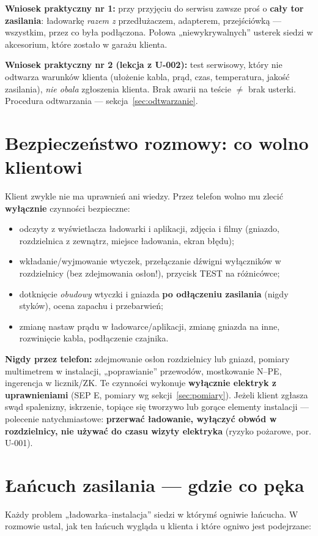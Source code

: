 \documentclass[11pt]{article}
\newcommand{\key}[1]{\textbf{\color{navy}#1}}
\newcommand{\warn}[1]{\textbf{\color{warnred}#1}}
\begin{document}
\key{Wniosek praktyczny nr 1:} przy przyjęciu do serwisu zawsze proś o \key{cały tor zasilania}: ładowarkę \emph{razem z} przedłużaczem, adapterem, przejściówką — wszystkim, przez co była podłączona. Połowa „niewykrywalnych'' usterek siedzi w akcesorium, które zostało w garażu klienta.

\key{Wniosek praktyczny nr 2 (lekcja z U-002):} test serwisowy, który nie odtwarza warunków klienta (ułożenie kabla, prąd, czas, temperatura, jakość zasilania), \emph{nie obala} zgłoszenia klienta. Brak awarii na teście $\neq$ brak usterki. Procedura odtwarzania — sekcja~\ref{sec:odtwarzanie}.

\section{Bezpieczeństwo rozmowy: co wolno klientowi}\label{sec:bezpieczenstwo}
Klient zwykle nie ma uprawnień ani wiedzy. Przez telefon wolno mu zlecić \key{wyłącznie} czynności bezpieczne:
\begin{itemize}
\item odczyty z wyświetlacza ładowarki i aplikacji, zdjęcia i filmy (gniazdo, rozdzielnica z zewnątrz, miejsce ładowania, ekran błędu);
\item wkładanie/wyjmowanie wtyczek, przełączanie dźwigni wyłączników w rozdzielnicy (bez zdejmowania osłon!), przycisk TEST na różnicówce;
\item dotknięcie \emph{obudowy} wtyczki i gniazda \key{po odłączeniu zasilania} (nigdy styków), ocena zapachu i przebarwień;
\item zmianę nastaw prądu w ładowarce/aplikacji, zmianę gniazda na inne, rozwinięcie kabla, podłączenie czajnika.
\end{itemize}
\warn{Nigdy przez telefon:} zdejmowanie osłon rozdzielnicy lub gniazd, pomiary multimetrem w instalacji, „poprawianie'' przewodów, mostkowanie N--PE, ingerencja w licznik/ZK. Te czynności wykonuje \key{wyłącznie elektryk z uprawnieniami} (SEP E, pomiary wg sekcji~\ref{sec:pomiary}). Jeżeli klient zgłasza swąd spalenizny, iskrzenie, topiące się tworzywo lub gorące elementy instalacji — polecenie natychmiastowe: \warn{przerwać ładowanie, wyłączyć obwód w rozdzielnicy, nie używać do czasu wizyty elektryka} (ryzyko pożarowe, por. U-001).

\section{Łańcuch zasilania — gdzie co pęka}\label{sec:lancuch}
Każdy problem „ładowarka--instalacja'' siedzi w którymś ogniwie łańcucha. W rozmowie ustal, jak ten łańcuch wygląda u klienta i które ogniwo jest podejrzane:
\end{document}

